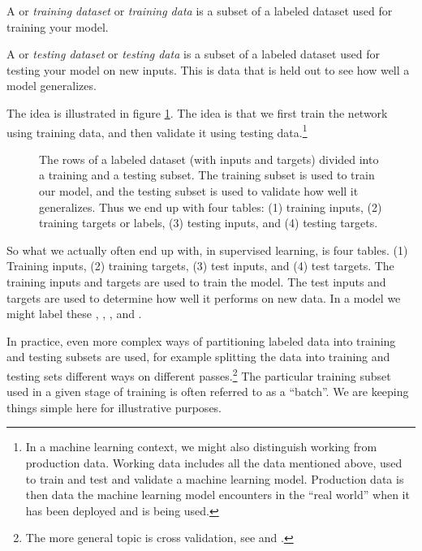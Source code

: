 A  or \emph{training dataset} or \emph{training data} is a subset of a labeled dataset used for training your model.

A   or \emph{testing dataset} or \emph{testing data} is a subset of a labeled dataset used for testing your model on new inputs. This is data that is held out to see how well a model generalizes. 

The idea is illustrated in figure \ref{trainTest}. The idea is that we first train the network using training data, and then validate it using testing data.\footnote{In a machine learning context, we might also distinguish working from production data. Working data includes all the data mentioned above, used to train and test and validate a machine learning model. Production data is then data the machine learning model encounters in the ``real world'' when it has been deployed and is being used.} 

\begin{figure}[h]
\centering
{}
\caption[Jeff Yoshimi.]{The rows of a labeled dataset (with inputs and targets) divided into a training and a  testing subset. The training subset is used to train our model, and the testing subset is used to validate how well it generalizes. Thus we end up with four tables: (1) training inputs, (2)  training targets or labels, (3) testing inputs, and (4) testing targets. }
\label{trainTest}
\end{figure}

So what we actually often end up with, in supervised learning, is four tables. (1) Training inputs, (2) training targets, (3) test inputs, and (4) test targets. The training inputs and targets are used to train the model. The test inputs and targets are used to determine how well it performs on new data. In a model we might label these , , , and . 

In practice, even more complex ways of partitioning labeled data into training and testing subsets are used, for example splitting the data into training and testing sets different ways on different passes.\footnote{The more general topic is cross validation, see  and .} The particular training subset used in a given stage of training is often referred to as a ``batch''. We are keeping things simple here for illustrative purposes.
 
